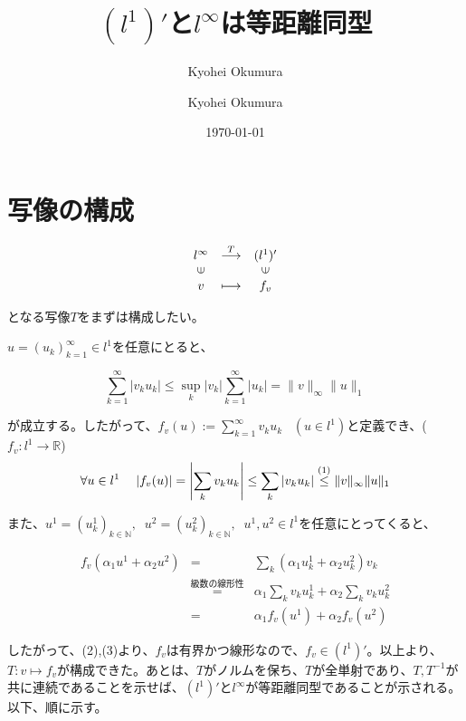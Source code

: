 \documentclass[11pt,a4paper]{article}
\author{Kyohei Okumura}
\begin{document}
\title{$(l^1)'$と$l^{\infty}$は等距離同型}
\author{Kyohei Okumura}
\date{\today}
\maketitle

\section{写像の構成}
$$
\begin{array}{ccc}
l^{\infty} & \stackrel{T}{\longrightarrow} & (l^1)' \\
\rotatebox{90}{$\in$} & & \rotatebox{90}{$\in$} \\
v & \longmapsto & f_v
\end{array}
$$

となる写像$T$をまずは構成したい。

$u = (u_k)_{k=1}^\infty \in l^1$を任意にとると、

\begin{equation}
\displaystyle{\sum_{k=1}^{\infty}\left|v_ku_k\right| \leq \sup_{k}\left|v_k\right| \sum_{k=1}^{\infty}\left|u_k\right| = \|v\|_{\infty} \|u\|_{1}  } 
\end{equation}

が成立する。したがって、$f_v(u) := \displaystyle{\sum_{k=1}^{\infty}v_{k}u_{k}} \;\;\; (u \in l^1)$と定義でき、($f_v:l^1 \to \mathbb{R}$)
\begin{equation}
\forall u \in l^1  \;\;\;\;  \left| f_v(u) \right| = \displaystyle{\left|\sum_{k}v_{k}u_{k}\right| \leq \sum_{k}\left|v_{k}u_{k}\right| \overset{\text\small\textrm{(1)}}{\leq} \|v\|_{\infty} \|u\|_{1}}
\end{equation}

また、$u^1=(u_k^1)_{k \in \mathbb{N}}, \;\; u^2 = (u_k^2)_{k \in \mathbb{N}}, \;\; u^1,u^2\in l^1$を任意にとってくると、

\begin{eqnarray}
f_v(\alpha_1 u^1 + \alpha_2 u^2) &=& \sum_k(\alpha_1u_k^1 + \alpha_2u_k^2)v_k \nonumber \\
&\overset{\textrm{級数の線形性}}{=}& \alpha_1 \sum_{k}v_ku_k^1 + \alpha_2 \sum_{k}v_ku_k^2  \nonumber \\
&=& \alpha_1 f_v(u^1) + \alpha_2 f_v(u^2)
\end{eqnarray}

したがって、(2),(3)より、$f_v$は有界かつ線形なので、$f_v \in (l^1)'$。以上より、$T: v \longmapsto f_v$が構成できた。あとは、$T$がノルムを保ち、$T$が全単射であり、$T,T^{-1}$が共に連続であることを示せば、$(l^1)'$と$l^{\infty}$が等距離同型であることが示される。以下、順に示す。
\end{document}
